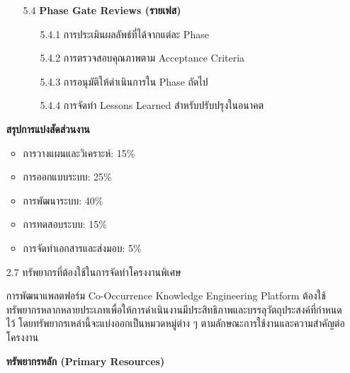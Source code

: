 \documentclass[12pt,a4paper]{article}
\newcommand{\textlight}[1]{{\thailightfont #1}}
\begin{document}
\begin{enumerate}[leftmargin=2cm]
{\begin{enumerate}
            \item[5.4] \textbf{Phase Gate Reviews (รายเฟส)}
            \begin{enumerate}
                \item[5.4.1] การประเมินผลลัพธ์ที่ได้จากแต่ละ Phase
                \item[5.4.2] การตรวจสอบคุณภาพตาม Acceptance Criteria
                \item[5.4.3] การอนุมัติให้ดำเนินการใน Phase ถัดไป
                \item[5.4.4] การจัดทำ Lessons Learned สำหรับปรับปรุงในอนาคต
            \end{enumerate}
        \end{enumerate}

        \vspace{0.3cm}

        \textbf{สรุปการแบ่งสัดส่วนงาน}
        
        \begin{itemize}
            \item การวางแผนและวิเคราะห์: 15\%
            \item การออกแบบระบบ: 25\%  
            \item การพัฒนาระบบ: 40\%
            \item การทดสอบระบบ: 15\%
            \item การจัดทำเอกสารและส่งมอบ: 5\%
        \end{itemize}
    }

    \vspace{2.2cm}

    \item[2.7] ทรัพยากรที่ต้องใช้ในการจัดทำโครงงานพิเศษ
    \vspace{0.05cm}
    \\
    \textlight{
        \hspace{1cm}การพัฒนาแพลตฟอร์ม Co-Occurrence Knowledge Engineering Platform ต้องใช้ทรัพยากรหลากหลายประเภทเพื่อให้การดำเนินงานมีประสิทธิภาพและบรรลุวัตถุประสงค์ที่กำหนดไว้ โดยทรัพยากรเหล่านี้จะแบ่งออกเป็นหมวดหมู่ต่าง ๆ ตามลักษณะการใช้งานและความสำคัญต่อโครงงาน

        \vspace{0.5cm}

        \textbf{ทรัพยากรหลัก (Primary Resources)}

}
\end{enumerate}
\end{document}
